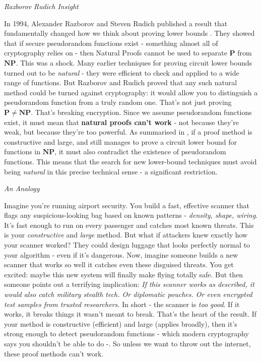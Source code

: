\documentclass[12pt]{report}
\begin{document}
\begin{center}
    \vspace{0cm}
    {\Large\itshape Razborov Rudich Insight\par}
\end{center}
In 1994, Alexander Razborov and Steven Rudich published a result that fundamentally changed how we think about proving lower bounds \cite{razborov1994}.
They showed that if secure pseudorandom functions exist - something almost all of cryptography relies on - then Natural Proofs cannot be used to separate $\mathbf{P}$ from $\mathbf{NP}$.
This was a shock. Many earlier techniques for proving circuit lower bounds turned out to be \textit{natural} - they were efficient to check and applied to a wide range of functions.  
But Razborov and Rudich proved that any such natural method could be turned against cryptography: it would allow you to distinguish a pseudorandom function from a truly random one.
That's not just proving $\mathbf{P \ne NP}$.
That's breaking encryption.  
Since we assume pseudorandom functions exist, it must mean that \textbf{natural proofs can't work} - not because they're weak, but because they're too powerful.
As summarised in \cite{arora2009}, if a proof method is constructive and large, and still manages to prove a circuit lower bound for functions in $\mathbf{NP}$, it must also contradict the existence of pseudorandom functions.
This means that the search for new lower-bound techniques must avoid being \textit{natural} in this precise technical sense - a significant restriction.

\begin{center}
    \vspace{0cm}
    {\large\itshape An Analogy\par}
\end{center}
Imagine you're running airport security.  
You build a fast, effective scanner that flags any suspicious-looking bag based on known patterns - \textit{density, shape, wiring}.
It's fast enough to run on every passenger and catches most known threats.
This is your \textit{constructive} and \textit{large} method.
But what if attackers knew exactly how your scanner worked?  
They could design luggage that looks perfectly normal to your algorithm - even if it's dangerous.
Now, imagine someone builds a new scanner that works so well it catches even these disguised threats.
You get excited: maybe this new system will finally make flying totally safe.
But then someone points out a terrifying implication:  
\textit{If this scanner works as described, it would also catch military stealth tech. Or diplomatic pouches. Or even encrypted test samples from trusted researchers.}
In short - the scanner is \textit{too good}.  
If it works, it breaks things it wasn't meant to break.
That's the heart of the \cite{razborov1994} result.
If your method is constructive (efficient) and large (applies broadly), then it's strong enough to detect pseudorandom functions - which modern cryptography says you shouldn't be able to do -\cite{arora2009}.  
So unless we want to throw out the internet, these proof methods can't work.



\end{document}
